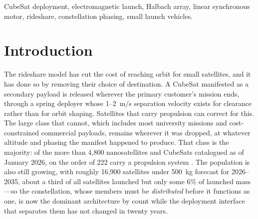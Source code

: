 \documentclass[conference]{IEEEtran}
\begin{document}
\begin{abstract}
\textbf{1.50}, which is the figure any risk-weighted comparison must use because a satellite the deployer fails to release delivers nothing; an independent propagator reproduced the earlier 20.4~m/s operating point at mean and high solar activity but not at low; the current 1.62 multiplier has not been independently rerun, so the ratio is quoted at a stated activity level and is not claimed invariant, and differential ejection velocities of 2--10~m/s establish 30$^\circ$ constellation spacing in 1.4--6.9 days against 25 days for differential-drag phasing under identical assumptions. The mass model closes the system at 76.5~kg dry and 124.5~kg loaded; its component lumps are not physical measurements. Host integration is developed generically for any restartable upper stage or hosted platform, with ISRO's POEM and Skyroot's Vikram-1 kick stage analyzed as candidate first hosts. The concept of operations treats the host as an active participant rather than a mounting surface: after primary separation a spent stage repositions between altitude shells on its own reaction control and fires satellites at each station before disposal, which a reachable-envelope analysis prices at 27.8~m/s per 50~km shell and bounds by excluding plane change entirely at 133~m/s per degree.
\end{abstract}

\begin{IEEEkeywords}
CubeSat deployment, electromagnetic launch, Halbach array, linear synchronous motor, rideshare, constellation phasing, small launch vehicles.
\end{IEEEkeywords}

\section{Introduction}
The rideshare model has cut the cost of reaching orbit for small satellites, and it has done so by removing their choice of destination. A CubeSat manifested as a secondary payload is released wherever the primary customer's mission ends, through a spring deployer whose 1--2~m/s separation velocity exists for clearance rather than for orbit shaping. Satellites that carry propulsion can correct for this. The large class that cannot, which includes most university missions and cost-constrained commercial payloads, remains wherever it was dropped, at whatever altitude and phasing the manifest happened to produce. That class is the majority: of the more than 4{,}800 nanosatellites and CubeSats catalogued as of January 2026, on the order of 222 carry a propulsion system \cite{nanosats}. The population is also still growing, with roughly 16{,}900 satellites under 500~kg forecast for 2026--2035, about a third of all satellites launched but only some 6\% of launched mass \cite{novaspace}---so the constellation, whose members must be \emph{distributed} before it functions as one, is now the dominant architecture by count while the deployment interface that separates them has not changed in twenty years.
\end{document}
